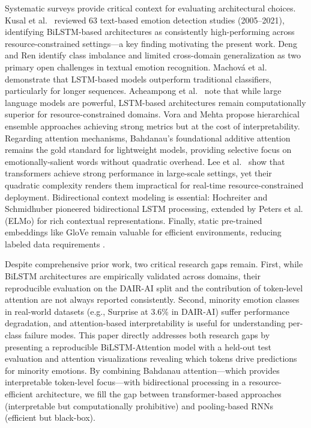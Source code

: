 \documentclass[conference]{IEEEtran}
\begin{document}
Systematic surveys provide critical context for evaluating architectural choices. Kusal et al.~\cite{kusal2023} reviewed 63 text-based emotion detection studies (2005--2021), identifying BiLSTM-based architectures as consistently high-performing across resource-constrained settings—a key finding motivating the present work. Deng and Ren \cite{deng2023} identify class imbalance and limited cross-domain generalization as two primary open challenges in textual emotion recognition. Machová et al.~\cite{machova2023} demonstrate that LSTM-based models outperform traditional classifiers, particularly for longer sequences. Acheampong et al.~\cite{acheampong2021} note that while large language models are powerful, LSTM-based architectures remain computationally superior for resource-constrained domains. Vora and Mehta \cite{vora2024} propose hierarchical ensemble approaches achieving strong metrics but at the cost of interpretability. Regarding attention mechanisms, Bahdanau's foundational additive attention \cite{bahdanau2015} remains the gold standard for lightweight models, providing selective focus on emotionally-salient words without quadratic overhead. Lee et al.~\cite{lee2023} show that transformers achieve strong performance in large-scale settings, yet their quadratic complexity renders them impractical for real-time resource-constrained deployment. Bidirectional context modeling is essential: Hochreiter and Schmidhuber \cite{hochreiter1997} pioneered bidirectional LSTM processing, extended by Peters et al. \cite{peters2018} (ELMo) for rich contextual representations. Finally, static pre-trained embeddings like GloVe \cite{pennington2014} remain valuable for efficient environments, reducing labeled data requirements \cite{howard2018}.

Despite comprehensive prior work, two critical research gaps remain. First, while BiLSTM architectures are empirically validated across domains, their reproducible evaluation on the DAIR-AI split and the contribution of token-level attention are not always reported consistently. Second, minority emotion classes in real-world datasets (e.g., Surprise at 3.6\% in DAIR-AI) suffer performance degradation, and attention-based interpretability is useful for understanding per-class failure modes. This paper directly addresses both research gaps by presenting a reproducible BiLSTM-Attention model with a held-out test evaluation and attention visualizations revealing which tokens drive predictions for minority emotions. By combining Bahdanau attention—which provides interpretable token-level focus—with bidirectional processing in a resource-efficient architecture, we fill the gap between transformer-based approaches (interpretable but computationally prohibitive) and pooling-based RNNs (efficient but black-box).
\end{document}
